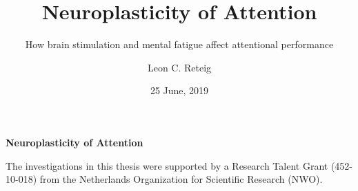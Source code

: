 \documentclass[12pt,a4paper,oldfontcommands]{memoir}
\title{Neuroplasticity of Attention}
\subtitle{How brain stimulation and mental fatigue affect attentional performance}
\author{Leon C. Reteig}
\date{25 June, 2019}
\begin{document}
\maketitle


\thispagestyle{empty}
{\pagestyle{empty} 


\clearpage %
\null
\newpage

\vspace*{2cm}
\begin{center}
\Huge\textbf{Neuroplasticity of Attention} %
\end{center}

\clearpage
\vspace*{0.66\textheight}
\noindent The investigations in this thesis were supported by 
a Research Talent Grant (452-10-018)  %
from 
the Netherlands Organization for Scientific Research (NWO). %

}
\end{document}
